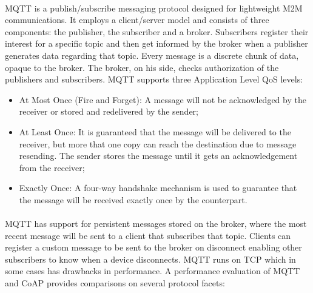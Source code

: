 \paragraph{}
	\ac{MQTT} \cite{OASIS2014} is a publish/subscribe messaging protocol designed for lightweight \ac{M2M} communications. It employs a client/server model and consists of three components: the publisher, the subscriber and a broker.
Subscribers register their interest for a specific topic and then get informed by the broker when a publisher generates data regarding that topic. Every message is a discrete chunk of data, opaque to the broker. The broker, on his side, checks authorization of the publishers and subscribers. \ac{MQTT} supports three Application Level \ac{QoS} levels:

\begin{itemize}
	\item At Most Once (Fire and Forget): A message will not be acknowledged by the receiver or stored and redelivered by the sender;\\
	\item At Least Once: It is guaranteed that the message will be delivered to the receiver, but more that one copy can reach the destination due to message resending. The sender stores the message until it gets an acknowledgement from the receiver;\\
	\item Exactly Once: A four-way handshake mechanism is used to guarantee that the message will be received exactly once by the counterpart.
\end{itemize}

\paragraph{}
\ac{MQTT} has support for persistent messages stored on the broker, where the most recent message will be sent to a client that subscribes that topic. Clients can register a custom message to be sent to the broker on disconnect enabling other subscribers to know when a device disconnects. \ac{MQTT} runs on \ac{TCP} which in some cases has drawbacks in performance. A performance evaluation of \ac{MQTT} and \ac{CoAP} \cite{Ma2014} provides comparisons on several protocol facets:

